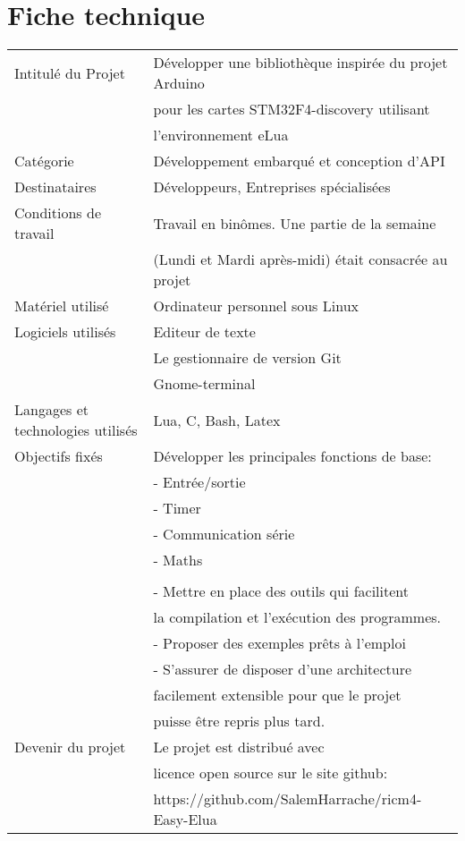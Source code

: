 \chapter{Fiche technique} \label{chap:fiche}

\begin{table}[h]
 \begin{tabular}{|l|l|} \hline
Intitulé du Projet & Développer une bibliothèque inspirée du projet Arduino \\
  & pour les cartes STM32F4-discovery utilisant \\
  & l'environnement eLua \\ \hline
Catégorie & Développement embarqué et conception d'API \\ \hline
Destinataires & Développeurs, Entreprises spécialisées \\ \hline
Conditions de travail & Travail en binômes. Une partie de la semaine \\
  & (Lundi et Mardi après-midi) était consacrée au projet \\ \hline
Matériel utilisé & Ordinateur personnel sous Linux \\ \hline
Logiciels utilisés & Editeur de texte \\
 & Le gestionnaire de version Git \\
 & Gnome-terminal \\ \hline
Langages et technologies utilisés & Lua, C, Bash, Latex \\ \hline
Objectifs fixés & Développer les principales fonctions de base: \\ 
 & - Entrée/sortie \\
 & - Timer \\
 & - Communication série \\ 
 & - Maths \\
 & \\
 & - Mettre en place des outils qui facilitent \\
 &   la compilation et l’exécution des programmes. \\
 & - Proposer des exemples prêts à l’emploi \\
 & - S’assurer de disposer d’une architecture \\
 &   facilement extensible pour que le projet \\
 &   puisse être repris plus tard.  \\ \hline
Devenir du projet & Le projet est distribué avec \\
  & licence open source sur le site github: \\
  & https://github.com/SalemHarrache/ricm4-Easy-Elua \\
\hline
 \end{tabular}
\end{table}
